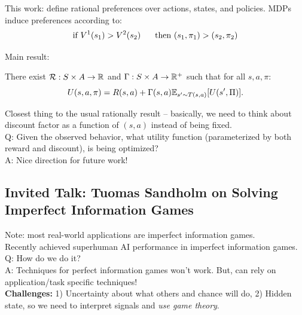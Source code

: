 
This work: define rational preferences over actions, states, and policies. MDPs induce preferences according to:
\[
\text{if  } V^1(s_1) > V^2(s_2)\hspace{6mm} \text{then } (s_1, \pi_1) > (s_2, \pi_2)
\]

Main result:
\begin{theorem}
There exist $\mathcal{R} : S \times A \rightarrow \mathbb{R}$ and $\Gamma: S \times A \rightarrow \mathbb{R}^+$ such that for all $s,a,\pi$:
\begin{equation}
    U(s,a,\pi) = R(s,a) + \Gamma(s,a) \mathbb{E}_{s'\sim T(s,a)}[U(s', \Pi)].
\end{equation}
\end{theorem}
Closest thing to the usual rationally result -- basically, we need to think about discount factor as a function of $(s,a)$ instead of being fixed. \\

Q: Given the observed behavior, what utility function (parameterized by both reward and discount), is being optimized? \\

A: Nice direction for future work!

\spacerule

\subsection{Invited Talk: Tuomas Sandholm on Solving Imperfect Information Games}

Note: most real-world applications are imperfect information games. \\

Recently achieved superhuman AI performance in imperfect information games. \\

Q: How do we do it? \\

A: Techniques for perfect information games won't work. But, can rely on application/task specific techniques! \\

{\bf Challenges:} 1) Uncertainty about what others and chance will do, 2) Hidden state, so we need to interpret signals and {\it use game theory}. \\


